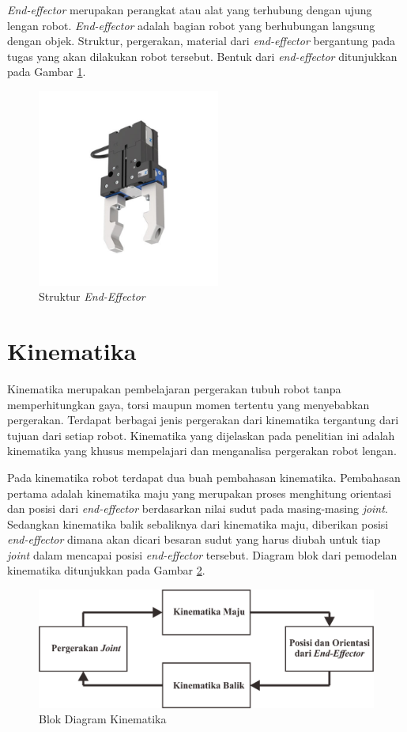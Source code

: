 \textit{End-effector} merupakan perangkat atau alat yang terhubung dengan ujung lengan robot. \textit{End-effector} adalah bagian robot yang berhubungan langsung dengan objek. Struktur, pergerakan, material dari \textit{end-effector} bergantung pada tugas yang akan dilakukan robot tersebut. Bentuk dari \textit{end-effector} ditunjukkan pada Gambar \ref{pic.endeffector}.
\begin{figure}[H]
	\centering
	\includegraphics[width=6cm]{gambar/end_effector.jpg}
	\caption{Struktur \textit{End-Effector}\cite{Spong2006}}
	\label{pic.endeffector}
\end{figure}


\section{Kinematika}
Kinematika merupakan pembelajaran pergerakan tubuh robot tanpa memperhitungkan gaya, torsi maupun momen tertentu yang menyebabkan pergerakan. Terdapat berbagai jenis pergerakan dari kinematika tergantung dari tujuan dari setiap robot. Kinematika yang dijelaskan pada penelitian ini adalah kinematika yang khusus mempelajari dan menganalisa pergerakan robot lengan.  

Pada kinematika robot terdapat dua buah pembahasan kinematika. Pembahasan pertama adalah kinematika maju yang merupakan proses menghitung orientasi dan posisi dari\textit{ end-effector} berdasarkan nilai sudut pada masing-masing \textit{joint}.  Sedangkan kinematika balik sebaliknya dari kinematika maju, diberikan posisi \textit{end-effector} dimana akan dicari besaran sudut yang harus diubah untuk tiap \textit{joint} dalam mencapai posisi \textit{end-effector} tersebut\cite{beni}. Diagram blok dari pemodelan kinematika ditunjukkan pada Gambar \ref{pic.diagram.kinematika}. 
\begin{figure}[H]
	\centering
	\includegraphics[width=12cm]{gambar/kinematika_diagram.png}
	\caption{Blok Diagram Kinematika}
	\label{pic.diagram.kinematika}
\end{figure}

